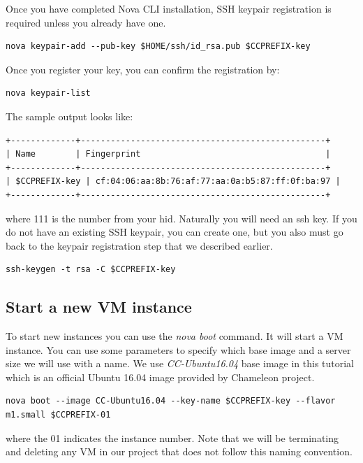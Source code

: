 Once you have completed Nova CLI installation, SSH keypair registration is
required unless you already have one.

\begin{lstlisting}
nova keypair-add --pub-key $HOME/ssh/id_rsa.pub $CCPREFIX-key
\end{lstlisting}

Once you register your key, you can confirm the registration by:

\begin{lstlisting}
nova keypair-list
\end{lstlisting}

The sample output looks like:

\begin{lstlisting}
+-------------+-------------------------------------------------+
| Name        | Fingerprint                                     |
+-------------+-------------------------------------------------+
| $CCPREFIX-key | cf:04:06:aa:8b:76:af:77:aa:0a:b5:87:ff:0f:ba:97 |
+-------------+-------------------------------------------------+
\end{lstlisting}

where 111 is the number from your hid.  Naturally you will need an ssh
key.  If you do not have an existing SSH keypair, you can create one,
but you also must go back to the keypair registration step that we
described earlier.

\begin{lstlisting}
ssh-keygen -t rsa -C $CCPREFIX-key
\end{lstlisting}


\subsection{Start a new VM instance}

To start new instances you can use the \textit{nova boot} command. It
will start a VM instance. You can use some parameters to specify which
base image and a server size we will use with a name. We use
\textit{CC-Ubuntu16.04} base image in this tutorial which is an
official Ubuntu 16.04 image provided by Chameleon project.

\begin{lstlisting}
nova boot --image CC-Ubuntu16.04 --key-name $CCPREFIX-key --flavor m1.small $CCPREFIX-01
\end{lstlisting}

where the 01 indicates the instance number. Note that we will be
terminating and deleting any VM in our project that does not follow
this naming convention.

